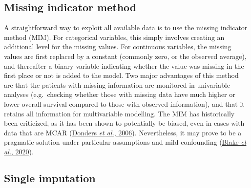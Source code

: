 \documentclass[
  letterpaper,
  DIV=11,
  numbers=noendperiod]{scrreprt}
\begin{document}
\hypertarget{missing-indicator-method}{%
\subsection{Missing indicator method}\label{missing-indicator-method}}

A straightforward way to exploit all available data is to use the
missing indicator method (MIM). For categorical variables, this simply
involves creating an additional level for the missing values. For
continuous variables, the missing values are first replaced by a
constant (commonly zero, or the observed average), and thereafter a
binary variable indicating whether the value was missing in the first
place or not is added to the model. Two major advantages of this method
are that the patients with missing information are monitored in
univariable analyses (e.g.~checking whether those with missing data have
much higher or lower overall survival compared to those with observed
information), and that it retains all information for multivariable
modelling. The MIM has historically been criticized, as it has been
shown to potentially be biased, even in cases with data that are MCAR
(\protect\hyperlink{ref-dondersReviewGentleIntroduction2006}{Donders
\emph{et al.}, 2006}). Nevertheless, it may prove to be a pragmatic
solution under particular assumptions and mild confounding
(\protect\hyperlink{ref-blakeEstimatingTreatmentEffects2020}{Blake
\emph{et al.}, 2020}).

\hypertarget{single-imputation}{%
\subsection{Single imputation}\label{single-imputation}}
\end{document}
